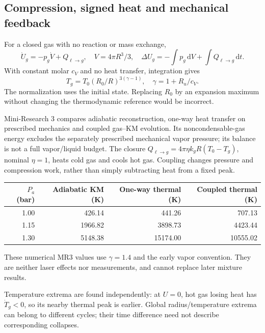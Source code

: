 \documentclass[11pt,a4paper]{article}
\newcommand{\dd}{\mathrm d}
\begin{document}
\subsection{Compression, signed heat and mechanical feedback}
For a closed gas with no reaction or mass exchange,
\begin{equation}\label{eq:gasenergy}
\dot U_g=-p_g\dot V+Q_{\ell\to g},\quad V=4\pi R^3/3,\quad
\Delta U_g=-\int p_g\,\dd V+\int Q_{\ell\to g}\,\dd t.
\end{equation}
With constant molar $c_V$ and no heat transfer, integration gives
\begin{equation}T_g=T_0(R_0/R)^{3(\gamma-1)},\quad \gamma=1+R_u/c_V.\end{equation}
The normalization uses the initial state. Replacing $R_0$ by an expansion maximum without changing the thermodynamic reference would be incorrect.

Mini-Research 3 compares adiabatic reconstruction, one-way heat transfer on prescribed mechanics and coupled gas--KM evolution. Its noncondensable-gas energy excludes the separately prescribed mechanical vapor pressure; its balance is not a full vapor/liquid budget.
The closure $Q_{\ell\to g}=4\pi\eta k_gR(T_0-T_g)$, nominal $\eta=1$, heats cold gas and cools hot gas. Coupling changes pressure and compression work, rather than simply subtracting heat from a fixed peak.
\begin{center}\small
\begin{tabular}{rrrr}\toprule
$P_a$ (bar)&Adiabatic KM (K)&One-way thermal (K)&Coupled thermal (K)\\\midrule
1.00&426.14&441.26&707.13\\
1.15&1966.82&3898.73&4423.44\\
1.30&5148.38&15174.00&10555.02\\\bottomrule
\end{tabular}
\end{center}
These numerical MR3 values use $\gamma=1.4$ and the early vapor convention. They are neither laser effects nor measurements, and cannot replace later mixture results.

Temperature extrema are found independently: at $U=0$, hot gas losing heat has $\dot T_g<0$, so its nearby thermal peak is earlier. Global radius/temperature extrema can belong to different cycles; their time difference need not describe corresponding collapses.
\end{document}
